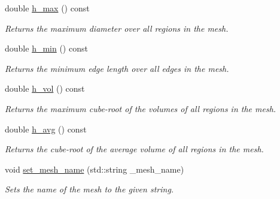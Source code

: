 \begin{DoxyCompactItemize}
\mbox{\label{classStemMesh3D_1_1mesh__3Dv_a1b5982bc8d9d594a86a4dbfa96535528}} 
double \hyperlink{classStemMesh3D_1_1mesh__3Dv_a1b5982bc8d9d594a86a4dbfa96535528}{h\+\_\+max} () const
\begin{DoxyCompactList}\small\item\em Returns the maximum diameter over all regions in the mesh. \end{DoxyCompactList}\item 
\mbox{\label{classStemMesh3D_1_1mesh__3Dv_ab238bb015dbd3325d9dabcfe36e56498}} 
double \hyperlink{classStemMesh3D_1_1mesh__3Dv_ab238bb015dbd3325d9dabcfe36e56498}{h\+\_\+min} () const
\begin{DoxyCompactList}\small\item\em Returns the minimum edge length over all edges in the mesh. \end{DoxyCompactList}\item 
\mbox{\label{classStemMesh3D_1_1mesh__3Dv_a3722bcc23212e0f22d11b6c32745c3c3}} 
double \hyperlink{classStemMesh3D_1_1mesh__3Dv_a3722bcc23212e0f22d11b6c32745c3c3}{h\+\_\+vol} () const
\begin{DoxyCompactList}\small\item\em Returns the maximum cube-\/root of the volumes of all regions in the mesh. \end{DoxyCompactList}\item 
\mbox{\label{classStemMesh3D_1_1mesh__3Dv_ae2fa08ebf584d6d0d1fdc1ccb6be603c}} 
double \hyperlink{classStemMesh3D_1_1mesh__3Dv_ae2fa08ebf584d6d0d1fdc1ccb6be603c}{h\+\_\+avg} () const
\begin{DoxyCompactList}\small\item\em Returns the cube-\/root of the average volume of all regions in the mesh. \end{DoxyCompactList}\item 
void \hyperlink{classStemMesh3D_1_1mesh__3Dv_ac40eb6e8236253c78ce71c0fd876d539}{set\+\_\+mesh\+\_\+name} (std\+::string \+\_\+mesh\+\_\+name)
\begin{DoxyCompactList}\small\item\em Sets the name of the mesh to the given string. \end{DoxyCompactList}\item 

\end{DoxyCompactItemize}

